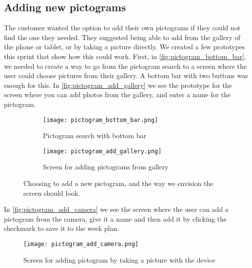 \subsection{Adding new pictograms}
The customer wanted the option to add their own pictograms if they could not find the one they needed.
They suggested being able to add from the gallery of the phone or tablet, or by taking a picture directly.
We created a few prototypes this sprint that show how this could work.
First, in \autoref{fig:pictogram_bottom_bar}, we needed to create a way to go from the pictogram search to a screen where the user could choose pictures from their gallery.
A bottom bar with two buttons was enough for this.
In \autoref{fig:pictogram_add_gallery} we see the prototype for the screen where you can add photos from the gallery, and enter a name for the pictogram.
\begin{figure}[H]
    \begin{subfigure}{0.5\textwidth}
    \texttt{[image: pictogram\_bottom\_bar.png]} 
    \caption{Pictogram search with bottom bar}
    \label{fig:pictogram_bottom_bar}
    \end{subfigure}
    \begin{subfigure}{0.5\textwidth}
        \texttt{[image: pictogram\_add\_gallery.png]}
    \caption{Screen for adding pictograms from gallery}
    \label{fig:pictogram_add_gallery}
    \end{subfigure} 
    \caption{Choosing to add a new pictogram, and the way we envision the screen should look.}
    \label{fig:pictogram_bottom_bar_and_pictogram_add_gallery}
\end{figure}
\noindent
In \autoref{fig:pictogram_add_camera} we see the screen where the user can add a pictogram from the camera, give it a name and then add it by clicking the checkmark to save it to the week plan.

\begin{figure}
    \centering
    \texttt{[image: pictogram\_add\_camera.png]}
    \caption{Screen for adding pictogram by taking a picture with the device}
    \label{fig:pictogram_add_camera}
\end{figure}